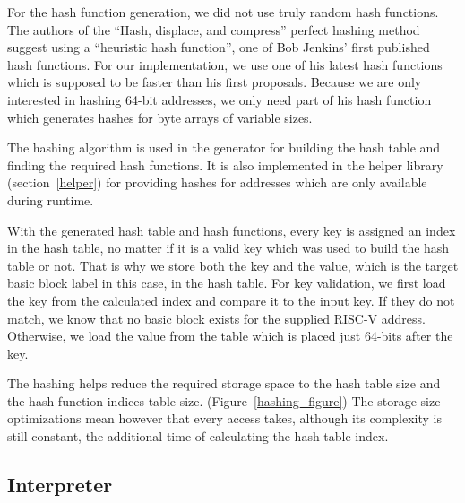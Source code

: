 \documentclass[course=eragp]{aspdoc}
\begin{document}
\begin{enumerate}
          For the hash function generation, we did not use truly random hash functions. The authors of the ``Hash,
          displace, and compress'' perfect hashing method suggest using a ``heuristic hash
          function''\cite{CHD}, one of Bob Jenkins' first published hash functions.\cite{jenkins_hash_1} For
          our implementation, we use one of his latest hash functions which is supposed to be faster than his
          first proposals.\cite{jenkins_hash_2} Because we are only interested in hashing 64-bit addresses, we
          only need part of his hash function which generates hashes for byte arrays of variable sizes.

          \par

          The hashing algorithm is used in the generator for building the hash table and finding the required
          hash functions. It is also implemented in the helper library (section~\ref{helper}) for providing hashes for addresses
          which are only available during runtime.

          \par

          With the generated hash table and hash functions, every key is assigned an index in the hash table,
          no matter if it is a valid key which was used to build the hash table or not. That is why we store
          both the key and the value, which is the target basic block label in this case, in the hash table.
          For key validation, we first load the key from the calculated index and compare it to the input key.
          If they do not match, we know that no basic block exists for the supplied RISC-V address. Otherwise,
          we load the value from the table which is placed just 64-bits after the key.

          \par

          The hashing helps reduce the required storage space to the hash table size and the hash function
          indices table size. (Figure~\ref{hashing_figure}) The storage size optimizations mean however that
          every access takes, although its complexity is still constant, the additional time of calculating
          the hash table index.
\end{enumerate}

\subsection{Interpreter}\label{interpreter}
\end{document}
